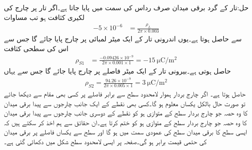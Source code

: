 حل:تار کے گرد برقی میدان صرف رداس کی سمت میں پایا جاتا ہے۔اگر تار پر چارج کی لکیری کثافت  ہو تب مساوات
\begin{align*}
-5 \times 10^{-6}&=\frac{\rho_L}{2 \pi  \times 0.003}
\end{align*}
سے  حاصل ہوتا ہے۔یوں اندرونی تار کے ایک میٹر لمبائی پر  چارج پایا جائے گا جس سے اس کی سطحی کثافت
\begin{align*}
\rho_{S1}&=\frac{-0.09426 \times 10^{-9}}{2\pi \times 0.001 \times 1}=\SI{-15}{\micro \coulomb \per \meter \squared}
\end{align*}
حاصل ہوتی ہے۔بیرونی تار کے ایک میٹر فاصلے پر  چارج پایا جائے گا جس سے یہاں
\begin{align*}
\rho_{S2}=\frac{94.26 \times 10^{-9}}{2\pi \times 0.005 \times 1}=\SI{3}{\micro \coulomb \per \meter \squared}
\end{align*}
حاصل ہوتا ہے۔
اگر چارج بردار ہموار لامحدود سطح  سے برابر فاصلے پر کسی بھی  مقام سے دیکھا جائے تو صورت حال بالکل یکساں معلوم ہو گا۔کسی بھی نقطے کے ایک جانب چارجوں سے پیدا برقی میدان کا وہ حصہ جو چارج بردار سطح  کے متوازی ہو کو نقطے کے دوسری جانب چارجوں سے پیدا برقی میدان کا وہ حصہ جو چارج بردار سطح  کے متوازی ہو کو ختم کرتا ہے۔ان حقائق سے ہم اخذ کر سکتے ہیں کہ ایسی سطح کا برقی میدان سطح کی عمودی سمت میں ہو گا اور سطح سے یکساں فاصلے پر برقی میدان کی حتمی قیمت برابر ہو گی۔صفحہ  پر ایسی لامحدود سطح شکل  میں دکھائی گئی ہے۔


